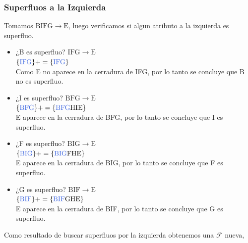 \documentclass[10pt]{article}
\begin{document}
\subsubsection{Superfluos a la Izquierda}
\noindent Tomamos $\mathrm{BIFG \rightarrow E}$, luego verificamos si algun atributo a la izquierda es superfluo. \\
\begin{itemize}


\item ¿B es superfluo? $\mathrm{IFG \rightarrow E}$\\

$\mathrm{\{\textcolor{RoyalBlue}{IFG}\}+= \{\textcolor{RoyalBlue}{IFG}\}}$\\
 	
Como E no aparece en la cerradura de IFG, por lo tanto se concluye que B no es superfluo.\\

\item ¿I es superfluo? $\mathrm{BFG \rightarrow E}$\\

$\mathrm{\{\textcolor{RoyalBlue}{BFG}\}+= \{\textcolor{RoyalBlue}{BFG}HIE\}}$\\

E aparece en la cerradura de BFG, por lo tanto se concluye que I es superfluo.\\

\item ¿F es superfluo? $\mathrm{BIG \rightarrow E}$\\

$\mathrm{\{\textcolor{RoyalBlue}{BIG}\}+= \{\textcolor{RoyalBlue}{BIG}FHE\}}$\\

E aparece en la cerradura de BIG, por lo tanto se concluye que F es superfluo.\\

\item ¿G es superfluo? $\mathrm{BIF \rightarrow E}$\\

$\mathrm{\{\textcolor{RoyalBlue}{BIF}\}+= \{\textcolor{RoyalBlue}{BIF}GHE\}}$\\

E aparece en la cerradura de BIF, por lo tanto se concluye que G es superfluo.\\

\end{itemize}

\noindent Como resultado de buscar superfluos por la izquierda obtenemos una $\mathcal{F}$ nueva,\\
\end{document}
